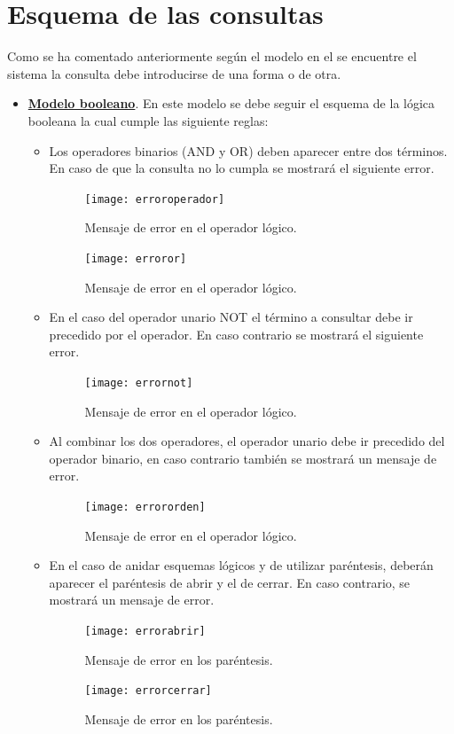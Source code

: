 \documentclass[size=a4, parskip=half, titlepage=false, toc=flat, toc=bib, 12pt]{scrartcl}
\theoremstyle{theorem-style}
\theoremstyle{definition-style}
\theoremstyle{remark-style}
\theoremstyle{example-style}
\theoremstyle{definition-style}
\theoremstyle{remark-style}
\begin{document}
\section{Esquema de las consultas}
Como se ha comentado anteriormente según el modelo en el se encuentre el sistema la consulta debe introducirse de una forma o de otra.
\begin{itemize}
\item \textbf{\underline{Modelo booleano}}. En este modelo se debe seguir el esquema de la lógica booleana la cual cumple las siguiente reglas:
\begin{itemize}
\item Los operadores binarios (AND y OR) deben aparecer entre dos términos. En caso de que la consulta no lo cumpla se mostrará el siguiente error.
\begin{figure}[H]
\centering
\texttt{[image: erroroperador]}
\caption{Mensaje de error en el operador lógico.}
\end{figure}
\begin{figure}[H]
\centering
\texttt{[image: erroror]}
\caption{Mensaje de error en el operador lógico.}
\end{figure}
\item En el caso del operador unario NOT el término a consultar debe ir precedido por el operador. En caso contrario se mostrará el siguiente error.
\begin{figure}[H]
\centering
\texttt{[image: errornot]}
\caption{Mensaje de error en el operador lógico.}
\end{figure}
\item Al combinar los dos operadores, el operador unario debe ir precedido del operador binario, en caso contrario también se mostrará un mensaje de error.
\begin{figure}[H]
\centering
\texttt{[image: errororden]}
\caption{Mensaje de error en el operador lógico.}
\end{figure}
\item En el caso de anidar esquemas lógicos y de utilizar paréntesis, deberán aparecer el paréntesis de abrir y el de cerrar. En caso contrario, se mostrará un mensaje de error.
\begin{figure}[H]
\centering
\texttt{[image: errorabrir]}
\caption{Mensaje de error en los paréntesis.}
\end{figure}
\begin{figure}[H]
\centering
\texttt{[image: errorcerrar]}
\caption{Mensaje de error en los paréntesis.}
\end{figure}

\end{itemize}
\end{itemize}
\end{document}
